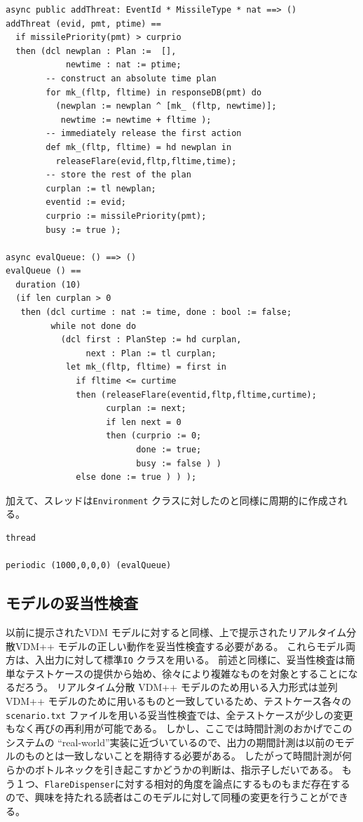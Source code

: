 \documentclass[\pformat,12pt]{jreport}
\begin{document}
\begin{lstlisting}
async public addThreat: EventId * MissileType * nat ==> ()
addThreat (evid, pmt, ptime) ==
  if missilePriority(pmt) > curprio
  then (dcl newplan : Plan :=  [],
            newtime : nat := ptime;
        -- construct an absolute time plan
        for mk_(fltp, fltime) in responseDB(pmt) do
          (newplan := newplan ^ [mk_ (fltp, newtime)];
           newtime := newtime + fltime );
        -- immediately release the first action
        def mk_(fltp, fltime) = hd newplan in
          releaseFlare(evid,fltp,fltime,time);
        -- store the rest of the plan
        curplan := tl newplan;
        eventid := evid;
        curprio := missilePriority(pmt);
        busy := true );

async evalQueue: () ==> ()
evalQueue () ==
  duration (10)
  (if len curplan > 0
   then (dcl curtime : nat := time, done : bool := false;
         while not done do
           (dcl first : PlanStep := hd curplan,
                next : Plan := tl curplan;
            let mk_(fltp, fltime) = first in
              if fltime <= curtime
              then (releaseFlare(eventid,fltp,fltime,curtime);
                    curplan := next;
                    if len next = 0
                    then (curprio := 0; 
                          done := true; 
                          busy := false ) )
              else done := true ) ) );
\end{lstlisting}

加えて、スレッドは\texttt{Environment} クラスに対したのと同様に周期的に作成される。

\begin{lstlisting}
thread

periodic (1000,0,0,0) (evalQueue)
\end{lstlisting}

\subsection{モデルの妥当性検査}

 以前に提示されたVDM モデルに対すると同様、上で提示されたリアルタイム分散VDM++ モデルの正しい動作を妥当性検査する必要がある。
これらモデル両方は、入出力に対して標準\texttt{IO} クラスを用いる。
前述と同様に、妥当性検査は簡単なテストケースの提供から始め、徐々により複雑なものを対象とすることになるだろう。
リアルタイム分散 VDM++ モデルのため用いる入力形式は並列 VDM++ モデルのために用いるものと一致しているため、テストケース各々の\texttt{scenario.txt} ファイルを用いる妥当性検査では、全テストケースが少しの変更もなく再びの再利用が可能である。
しかし、ここでは時間計測のおかげでこのシステムの ``real-world''実装に近づいているので、出力の期間計測は以前のモデルのものとは一致しないことを期待する必要がある。
したがって時間計測が何らかのボトルネックを引き起こすかどうかの判断は、指示子しだいである。
もう１つ、\texttt{FlareDispenser}に対する相対的角度を論点にするものもまだ存在するので、興味を持たれる読者はこのモデルに対して同種の変更を行うことができる。
\end{document}

